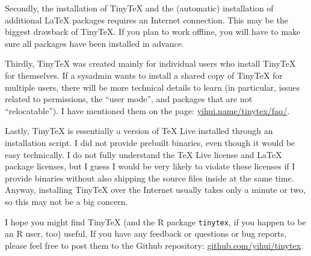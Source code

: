 \documentclass{tugboat}
\def\tinytex{\texttt{tinytex}}
\begin{document}
Secondly, the installation of TinyTeX and the (automatic) installation
of additional \LaTeX{} packages requires an Internet connection. This may
be the biggest drawback of TinyTeX. If you plan to work offline, you
will have to make sure all packages have been installed in advance.

Thirdly, TinyTeX was created mainly for individual users who install
TinyTeX for themselves. If a sysadmin wants to install a shared copy of
TinyTeX for multiple users, there will be more technical details to
learn (in particular, issues related to permissions, the ``user mode'',
and packages that are not ``relocatable''). I have mentioned them on the
 page: \url{yihui.name/tinytex/faq/}.

Lastly, TinyTeX is essentially a version of \TeX{} Live installed through
an installation script. I did not provide prebuilt binaries, even though
it would be easy technically. I do not fully understand the \TeX{} Live
license and \LaTeX{} package licenses, but I guess I would be very likely
to violate these licenses if I provide binaries without also shipping
the source files inside at the same time. Anyway, installing TinyTeX
over the Internet usually takes only a minute or two, so this may not be
a big concern.

I hope you might find TinyTeX (and the R package \tinytex{}, if
you happen to be an R user, too) useful. If you have any feedback or
questions or bug reports, please feel free to post them to the Github
repository: \url{github.com/yihui/tinytex}.




\makesignature
\end{document}
